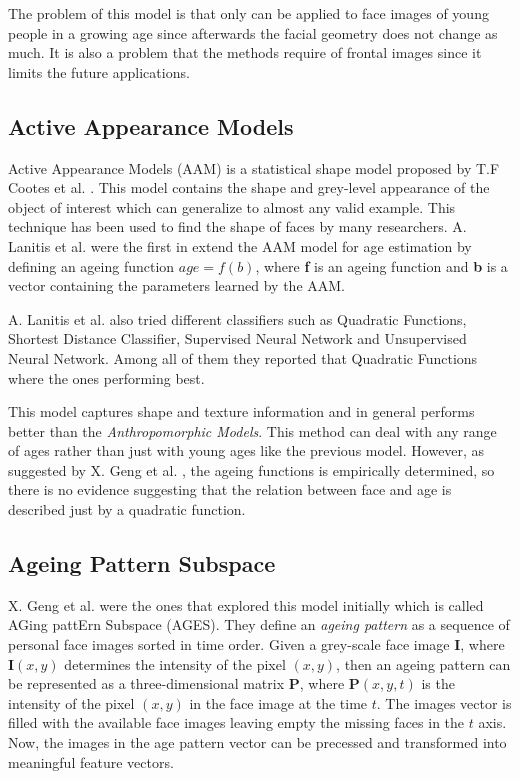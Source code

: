 The problem of this model is that only can be applied to face images of young people in a growing age since afterwards the facial geometry does not change as much. It is also a problem that the methods require of frontal images since it limits the future applications.

\subsection{Active Appearance Models}

Active Appearance Models (AAM) is a statistical shape model proposed by T.F Cootes et al. \cite{Cootes:2001:AAM:378040.378090}. This model contains the shape and grey-level appearance of the object of interest which can generalize to almost any valid example. This technique has been used to find the shape of faces by many researchers. A. Lanitis et al. \cite{791208, 993553, Lanitis:2004:CDC:2225304.2226166} were the first in extend the AAM model for age estimation by defining an ageing function $age=f(b)$, where \textbf{f} is an ageing function and \textbf{b} is a vector containing the parameters learned by the AAM.

A. Lanitis et al. \cite{Lanitis:2004:CDC:2225304.2226166} also tried different classifiers such as Quadratic Functions, Shortest Distance Classifier, Supervised Neural Network and Unsupervised Neural Network. Among all of them they reported that Quadratic Functions where the ones performing best.

This model captures shape and texture information and in general performs better than the \textit{Anthropomorphic Models}. This method can deal with any range of ages rather than just with young ages like the previous model. However, as suggested by X. Geng et al. \cite{Geng:2006:LFA:1180639.1180711}, the ageing functions is empirically determined, so there is no evidence suggesting that the relation between face and age is described just by a quadratic function.

\subsection{Ageing Pattern Subspace}

X. Geng et al. \cite{4359348, Geng:2006:LFA:1180639.1180711} were the ones that explored this model initially which is called AGing pattErn Subspace (AGES). They define an \textit{ageing pattern} as a sequence of personal face images sorted in time order. Given a grey-scale face image $\textbf{I}$, where $\textbf{I}(x,y)$ determines the intensity of the pixel $(x,y)$, then an ageing pattern can be represented as a three-dimensional matrix $\textbf{P}$, where $\textbf{P}(x,y,t)$ is the intensity of the pixel $(x,y)$ in the face image at the time $t$. The images vector is filled with the available face images leaving empty the missing faces in the $t$ axis. Now, the images in the age pattern vector can be precessed and transformed into meaningful feature vectors.

